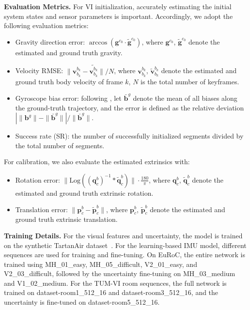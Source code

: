 \noindent\textbf{Evaluation Metrics.}
For VI initialization, accurately estimating the initial system states and sensor parameters is important. Accordingly, we adopt the following evaluation metrics:
\begin{itemize}
\item Gravity direction error: $\arccos(\mathbf{g}^{c_0} \cdot \tilde{\mathbf{g}}^{c_0})$, where $\mathbf{g}^{c_0}$, $\tilde{\mathbf{g}}^{c_0}$ denote the estimated and ground truth gravity.
\item Velocity RMSE: $\|\mathbf{v}^{b_k}_{b_k}-\tilde{\mathbf{v}^{b_k}_{b_k}}\| / N$, where $\mathbf{v}^{b_k}_{b_k}$, $\tilde{\mathbf{v}}^{b_k}_{b_k}$ denote the estimated and ground truth body velocity of frame $k$, $N$ is the total number of keyframes.
\item Gyroscope bias error: following \cite{he2023rotation, mu2025robust}, let $\bar{\mathbf{b}}^g$ denote the mean of all biases along the ground-truth trajectory, and the error is defined as the relative deviation $\left| \|\mathbf{b}^g\| - \|\bar{\mathbf{b}}^g\| \right| / \|\bar{\mathbf{b}}^g\|$.
\item Success rate (SR): the number of successfully initialized segments divided by the total number of segments.
\end{itemize}
For calibration, we also evaluate the estimated extrinsics with:
\begin{itemize}
\item Rotation error: $\|\text{Log}((\mathbf{q}^b_c)^{-1} * \tilde{\mathbf{q}}^b_c)\| \cdot \frac{180}{\pi}$, where $\mathbf{q}^b_c$, $\tilde{\mathbf{q}}^b_c$ denote the estimated and ground truth extrinsic rotation.
\item Translation error: $\|\mathbf{p}^b_c - \tilde{\mathbf{p}}^b_c\|$, where $\mathbf{p}^b_c$, $\tilde{\mathbf{p}}^b_c$ denote the estimated and ground truth extrinsic translation.
\end{itemize}


\noindent\textbf{Training Details.}
For the visual features and uncertainty, the model is trained on the synthetic TartanAir dataset~\cite{tartanair2020iros}. For the learning-based IMU model, different sequences are used for training and fine-tuning. On EuRoC, the entire network is trained using MH\_01\_easy, MH\_05\_difficult, V2\_01\_easy, and V2\_03\_difficult, followed by the uncertainty fine-tuning on MH\_03\_medium and V1\_02\_medium. For the TUM-VI room sequences, the full network is trained on dataset-room1\_512\_16 and dataset-room3\_512\_16, and the uncertainty is fine-tuned on dataset-room5\_512\_16.


